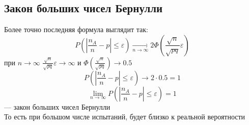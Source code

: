 \documentclass[english]{article}
\theoremstyle{plain}
\theoremstyle{remark}
\theoremstyle{definition}
\begin{document}
\subsection{Закон больших чисел Бернулли}
\label{sec:orge92f660}
Более точно последняя формула выглядит так:
\[ P\left(\left|\frac{n_A}{n} - p\right| \le \varepsilon\right) \xrightarrow[n \to \infty]{} 2\Phi\left(\frac{\sqrt{n}}{\sqrt{pq}}\varepsilon\right) \]
при \(n \to \infty\) \(\frac{\sqrt{n}}{\sqrt{pq}}\varepsilon \to \infty\) и \(\Phi\left(\frac{\sqrt{n}}{\sqrt{pq}}\right) \to 0.5\)
\[ P\left(\left|\frac{n_A}{n} - p\right| \le \varepsilon\right) \to 2\cdot0.5 = 1\]
\[ \lim_{n\to\infty}P\left(\left|\frac{n_A}{n} - p \right| \le \varepsilon \right) = 1 \]
--- закон больших чисел Бернулли \\
То есть при большом числе испытаний, будет близко к реальной вероятности
\end{document}
